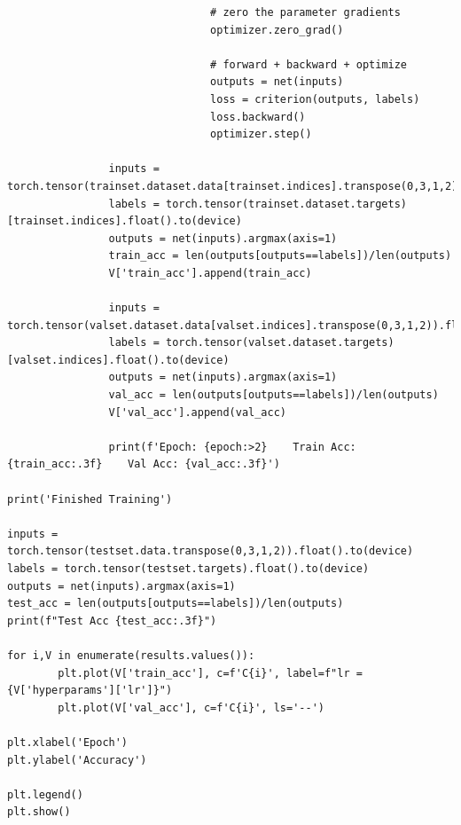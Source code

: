 \documentclass{article}
\begin{document}
\begin{enumerate}
\begin{verbatim}
                                # zero the parameter gradients
                                optimizer.zero_grad()
                        
                                # forward + backward + optimize
                                outputs = net(inputs)
                                loss = criterion(outputs, labels)
                                loss.backward()
                                optimizer.step()
        
                inputs = torch.tensor(trainset.dataset.data[trainset.indices].transpose(0,3,1,2)).float().to(device)
                labels = torch.tensor(trainset.dataset.targets)[trainset.indices].float().to(device)
                outputs = net(inputs).argmax(axis=1)
                train_acc = len(outputs[outputs==labels])/len(outputs)
                V['train_acc'].append(train_acc)
                
                inputs = torch.tensor(valset.dataset.data[valset.indices].transpose(0,3,1,2)).float().to(device)
                labels = torch.tensor(valset.dataset.targets)[valset.indices].float().to(device)
                outputs = net(inputs).argmax(axis=1)
                val_acc = len(outputs[outputs==labels])/len(outputs)
                V['val_acc'].append(val_acc)
        
                print(f'Epoch: {epoch:>2}    Train Acc: {train_acc:.3f}    Val Acc: {val_acc:.3f}')

print('Finished Training')

inputs = torch.tensor(testset.data.transpose(0,3,1,2)).float().to(device)
labels = torch.tensor(testset.targets).float().to(device)
outputs = net(inputs).argmax(axis=1)
test_acc = len(outputs[outputs==labels])/len(outputs)
print(f"Test Acc {test_acc:.3f}")

for i,V in enumerate(results.values()):
        plt.plot(V['train_acc'], c=f'C{i}', label=f"lr = {V['hyperparams']['lr']}")
        plt.plot(V['val_acc'], c=f'C{i}', ls='--')

plt.xlabel('Epoch')
plt.ylabel('Accuracy')

plt.legend()
plt.show()
                        \end{verbatim}


\end{enumerate}
\end{document}
